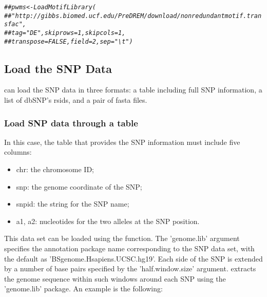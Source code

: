 \documentclass[a4paper,10pt]{article}\usepackage[]{graphicx}\usepackage[]{color}
\makeatletter
\newcommand{\hlcom}[1]{\textcolor[rgb]{0.678,0.584,0.686}{\textit{#1}}}%
\newenvironment{kframe}{%
 \def\at@end@of@kframe{}%
 \ifinner\ifhmode%
  \def\at@end@of@kframe{\end{minipage}}%
  \begin{minipage}{\columnwidth}%
 \fi\fi%
 \def\FrameCommand##1{\hskip\@totalleftmargin \hskip-\fboxsep
 \colorbox{shadecolor}{##1}\hskip-\fboxsep
     \hskip-\linewidth \hskip-\@totalleftmargin \hskip\columnwidth}%
 \MakeFramed {\advance\hsize-\width
   \@totalleftmargin\z@ \linewidth\hsize
   \@setminipage}}%
 {\par\unskip\endMakeFramed%
 \at@end@of@kframe}
\newenvironment{knitrout}{}{} %
\makeatother
\begin{document}
\begin{knitrout}
\begin{kframe}
\begin{alltt}
\hlcom{## pwms <- LoadMotifLibrary(}
\hlcom{##  "http://gibbs.biomed.ucf.edu/PreDREM/download/nonredundantmotif.transfac", }
\hlcom{##  tag = "DE", skiprows = 1, skipcols = 1, }
\hlcom{##  transpose = FALSE, field = 2, sep = "\textbackslash{}t")}
\end{alltt}
\end{kframe}
\end{knitrout}

\subsection{Load the SNP Data}

 can load the SNP data in three formats: a table including full SNP information, a list of dbSNP's rsids, and a pair of fasta files.

\subsubsection{Load SNP data through a table}


In this case, the table that provides the SNP information must include five columns:

\begin{itemize}
\item chr: the chromosome ID;
\item snp: the genome coordinate of the SNP;
\item snpid: the string for the SNP name;
\item a1, a2: nucleotides for the two alleles at the SNP position.
\end{itemize}
  

This data set can be loaded using the  function. The 'genome.lib' argument specifies the annotation package name corresponding to the SNP data set, with the default as 'BSgenome.Hsapiens.UCSC.hg19'. Each side of the SNP is extended by a number of base pairs specified by the 'half.window.size' argument.  extracts the genome sequence within such windows around each SNP using the 'genome.lib' package. An example is the following:
\end{document}

